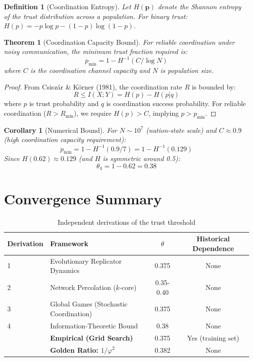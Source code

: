 \documentclass[11pt]{article}
\newtheorem{theorem}{Theorem}
\newtheorem{corollary}{Corollary}
\newtheorem{definition}{Definition}
\begin{document}
\begin{definition}[Coordination Entropy]
Let $H(\mathbf{p})$ denote the Shannon entropy of the trust distribution across a population. For binary trust: $H(p) = -p\log p - (1-p)\log(1-p)$.
\end{definition}

\begin{theorem}[Coordination Capacity Bound]
For reliable coordination under noisy communication, the minimum trust fraction required is:
\begin{equation}
p_{\min} = 1 - H^{-1}(C/\log N)
\end{equation}
where $C$ is the coordination channel capacity and $N$ is population size.
\end{theorem}

\begin{proof}
From Csiszár \& Körner (1981), the coordination rate $R$ is bounded by:
\begin{equation}
R \leq I(X; Y) = H(p) - H(p|q)
\end{equation}
where $p$ is trust probability and $q$ is coordination success probability. For reliable coordination ($R > R_{\min}$), we require $H(p) > C$, implying $p > p_{\min}$.
\end{proof}

\begin{corollary}[Numerical Bound]
For $N \sim 10^7$ (nation-state scale) and $C \approx 0.9$ (high coordination capacity requirement):
\begin{equation}
p_{\min} = 1 - H^{-1}(0.9/7) = 1 - H^{-1}(0.129)
\end{equation}
Since $H(0.62) \approx 0.129$ (and $H$ is symmetric around 0.5):
\begin{equation}
\theta_4 = 1 - 0.62 = \mathbf{0.38}
\end{equation}
\end{corollary}

\section{Convergence Summary}

\begin{table}[h]
\centering
\caption{Independent derivations of the trust threshold}
\begin{tabular}{llcc}
\toprule
\textbf{Derivation} & \textbf{Framework} & \textbf{$\theta$} & \textbf{Historical Dependence} \\
\midrule
1 & Evolutionary Replicator Dynamics & 0.375 & None \\
2 & Network Percolation ($k$-core) & 0.35-0.40 & None \\
3 & Global Games (Stochastic Coordination) & 0.375 & None \\
4 & Information-Theoretic Bound & 0.38 & None \\
\midrule
& \textbf{Empirical (Grid Search)} & 0.375 & Yes (training set) \\
& \textbf{Golden Ratio: $1/\varphi^2$} & 0.382 & None \\
\bottomrule
\end{tabular}
\end{table}
\end{document}
